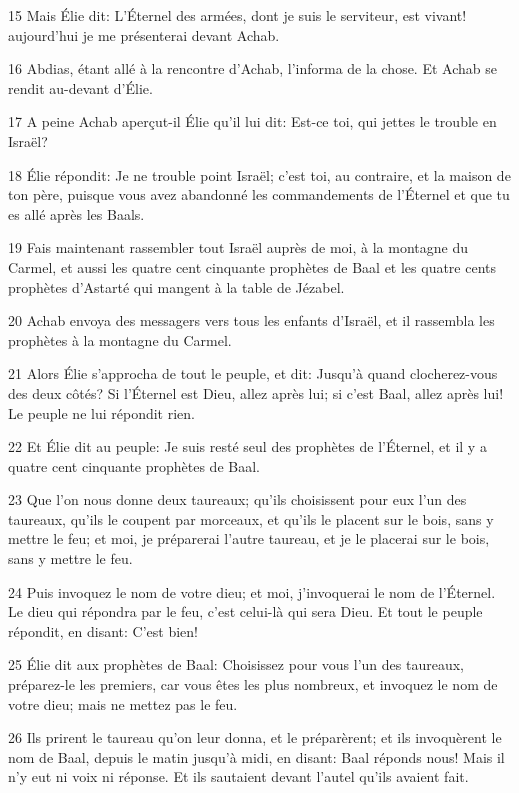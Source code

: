 \par 15 Mais Élie dit: L'Éternel des armées, dont je suis le serviteur, est vivant! aujourd'hui je me présenterai devant Achab.
\par 16 Abdias, étant allé à la rencontre d'Achab, l'informa de la chose. Et Achab se rendit au-devant d'Élie.
\par 17 A peine Achab aperçut-il Élie qu'il lui dit: Est-ce toi, qui jettes le trouble en Israël?
\par 18 Élie répondit: Je ne trouble point Israël; c'est toi, au contraire, et la maison de ton père, puisque vous avez abandonné les commandements de l'Éternel et que tu es allé après les Baals.
\par 19 Fais maintenant rassembler tout Israël auprès de moi, à la montagne du Carmel, et aussi les quatre cent cinquante prophètes de Baal et les quatre cents prophètes d'Astarté qui mangent à la table de Jézabel.
\par 20 Achab envoya des messagers vers tous les enfants d'Israël, et il rassembla les prophètes à la montagne du Carmel.
\par 21 Alors Élie s'approcha de tout le peuple, et dit: Jusqu'à quand clocherez-vous des deux côtés? Si l'Éternel est Dieu, allez après lui; si c'est Baal, allez après lui! Le peuple ne lui répondit rien.
\par 22 Et Élie dit au peuple: Je suis resté seul des prophètes de l'Éternel, et il y a quatre cent cinquante prophètes de Baal.
\par 23 Que l'on nous donne deux taureaux; qu'ils choisissent pour eux l'un des taureaux, qu'ils le coupent par morceaux, et qu'ils le placent sur le bois, sans y mettre le feu; et moi, je préparerai l'autre taureau, et je le placerai sur le bois, sans y mettre le feu.
\par 24 Puis invoquez le nom de votre dieu; et moi, j'invoquerai le nom de l'Éternel. Le dieu qui répondra par le feu, c'est celui-là qui sera Dieu. Et tout le peuple répondit, en disant: C'est bien!
\par 25 Élie dit aux prophètes de Baal: Choisissez pour vous l'un des taureaux, préparez-le les premiers, car vous êtes les plus nombreux, et invoquez le nom de votre dieu; mais ne mettez pas le feu.
\par 26 Ils prirent le taureau qu'on leur donna, et le préparèrent; et ils invoquèrent le nom de Baal, depuis le matin jusqu'à midi, en disant: Baal réponds nous! Mais il n'y eut ni voix ni réponse. Et ils sautaient devant l'autel qu'ils avaient fait.
